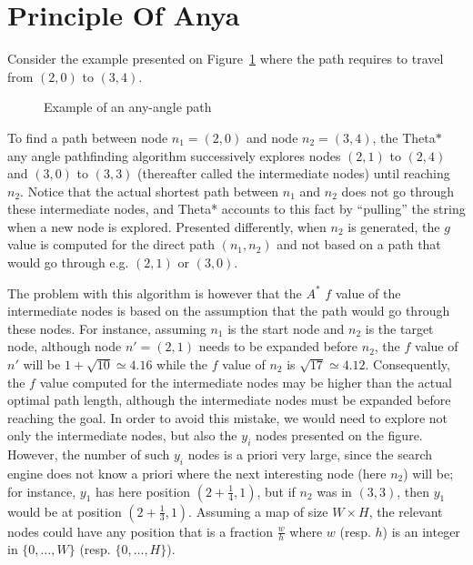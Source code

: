 \section{Principle Of Anya}
Consider the example presented on Figure~\ref{fig::ex1} 
where the path requires to travel from $(2,0)$ to $(3,4)$.  


\begin{figure}[ht]
  \begin{center}
    
  \end{center}
  \caption{Example of an any-angle path}
  \label{fig::ex1}
\end{figure}

To find a path between node $n_1 = (2,0)$ and node $n_2 = (3,4)$, 
the Theta$*$ any angle pathfinding algorithm \cite{nash10}
successively explores nodes $(2,1)$ to $(2,4)$ and $(3,0)$ to $(3,3)$ 
(thereafter called the intermediate nodes) until reaching $n_2$.  
Notice that the actual shortest path between $n_1$ and $n_2$ 
does not go through these intermediate nodes, 
and Theta* accounts to this fact by ``pulling'' the string 
when a new node is explored.  
Presented differently, when $n_2$ is generated, 
the $g$ value is computed for the direct path $(n_1,n_2)$ 
and not based on a path that would go through e.g. $(2,1)$ or $(3,0)$.  

The problem with this algorithm 
is however that the $A^*$ $f$ value of the intermediate nodes 
is based on the assumption that the path would go through these nodes.  
For instance, assuming $n_1$ is the start node 
and $n_2$ is the target node, 
although node $n' = (2,1)$ needs to be expanded before $n_2$, 
the $f$ value of $n'$ will be $1 + \sqrt{10} \simeq 4.16$ 
while the $f$ value of $n_2$ is $\sqrt{17} \simeq 4.12$.  
Consequently, the $f$ value computed 
for the intermediate nodes may be higher 
than the actual optimal path length, 
although the intermediate nodes must be expanded 
before reaching the goal.  
In order to avoid this mistake, 
we would need to explore not only the intermediate nodes, 
but also the $y_i$ nodes presented on the figure.  
However, the number of such $y_i$ nodes is a priori very large, 
since the search engine does not know a priori 
where the next interesting node (here $n_2$) will be; 
for instance, $y_1$ has here position $(2 + \frac{1}{4},1)$, 
but if $n_2$ was in $(3,3)$, 
then $y_1$ would be at position $(2 + \frac{1}{3},1)$.  
Assuming a map of size $W\times H$, 
the relevant nodes could have any position 
that is a fraction $\frac{w}{h}$ 
where $w$ (resp. $h$) is an integer 
in $\{0,\dots,W\}$ (resp. $\{0,\dots,H\}$).  

